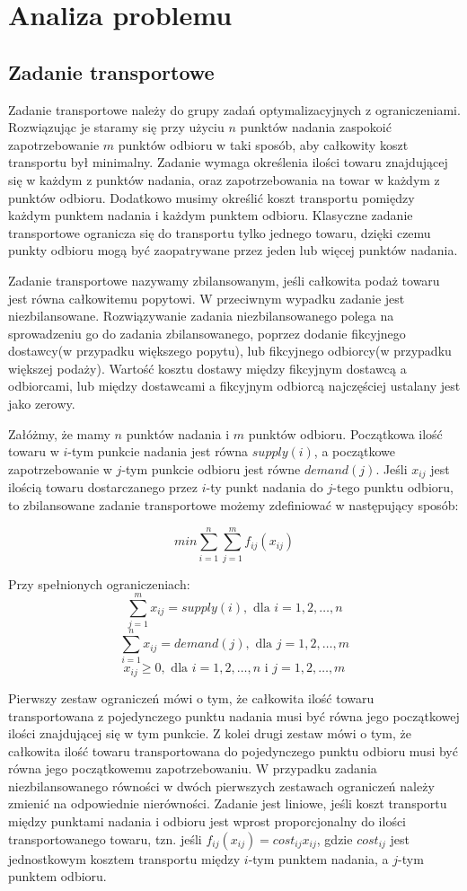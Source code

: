 \chapter{Analiza problemu}
\thispagestyle{chapterBeginStyle}
\label{rozdzial1}

\section{Zadanie transportowe}
Zadanie transportowe należy do grupy zadań optymalizacyjnych z ograniczeniami. Rozwiązując je staramy się przy użyciu $n$ punktów nadania 
zaspokoić zapotrzebowanie $m$ punktów odbioru w taki sposób, aby całkowity koszt transportu był minimalny. Zadanie wymaga określenia ilości 
towaru znajdującej się w każdym z punktów nadania, oraz zapotrzebowania na towar w każdym z punktów odbioru. Dodatkowo musimy określić 
koszt transportu pomiędzy każdym punktem nadania i każdym punktem odbioru. Klasyczne zadanie transportowe ogranicza się do transportu 
tylko jednego towaru, dzięki czemu punkty odbioru mogą być zaopatrywane przez jeden lub więcej punktów nadania.

Zadanie transportowe nazywamy zbilansowanym, jeśli całkowita podaż towaru jest równa całkowitemu popytowi. W przeciwnym wypadku 
zadanie jest niezbilansowane. Rozwiązywanie zadania niezbilansowanego polega na sprowadzeniu go do zadania zbilansowanego, poprzez 
dodanie fikcyjnego dostawcy(w przypadku większego popytu), lub fikcyjnego odbiorcy(w przypadku większej podaży). Wartość kosztu dostawy 
między fikcyjnym dostawcą a odbiorcami, lub między dostawcami a fikcyjnym odbiorcą najczęściej ustalany jest jako zerowy.

Załóżmy, że mamy $n$ punktów nadania i $m$ punktów odbioru. Początkowa ilość towaru w $i$-tym punkcie nadania jest równa $supply(i)$, 
a początkowe zapotrzebowanie w $j$-tym punkcie odbioru jest równe $demand(j)$. Jeśli $x_{ij}$ jest ilością towaru dostarczanego przez 
$i$-ty punkt nadania do $j$-tego punktu odbioru, to zbilansowane zadanie transportowe możemy zdefiniować w następujący sposób:

$$min \sum_{i=1}^{n} \sum_{j=1}^{m} f_{ij}(x_{ij})$$

Przy spełnionych ograniczeniach:
$$\sum_{j=1}^{m} x_{ij} = supply(i), \text{ dla } i = 1, 2, \dots, n$$
$$\sum_{i=1}^{n} x_{ij} = demand(j), \text{ dla } j = 1, 2, \dots, m$$
$$x_{ij} \ge 0, \text{ dla } i = 1, 2, \dots, n \text{ i } j = 1, 2, \dots, m$$

Pierwszy zestaw ograniczeń mówi o tym, że całkowita ilość towaru transportowana z pojedynczego punktu nadania musi być równa jego początkowej 
ilości znajdującej się w tym punkcie. Z kolei drugi zestaw mówi o tym, że całkowita ilość towaru transportowana do pojedynczego punktu odbioru 
musi być równa jego początkowemu zapotrzebowaniu. W przypadku zadania niezbilansowanego równości w dwóch pierwszych zestawach ograniczeń należy 
zmienić na odpowiednie nierówności. Zadanie jest liniowe, jeśli koszt transportu między punktami nadania i odbioru jest wprost proporcjonalny 
do ilości transportowanego towaru, tzn. jeśli $f_{ij}(x_{ij}) = cost_{ij} x_{ij}$, gdzie $cost_{ij}$ jest jednostkowym kosztem transportu 
między $i$-tym punktem nadania, a $j$-tym punktem odbioru.

